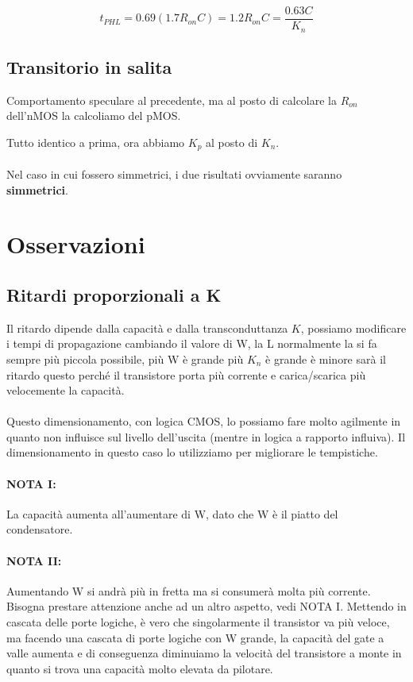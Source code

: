 \begin{equation*}
    t_{PHL} = 0.69(1.7R_{on}C) = 1.2R_{on}C = \frac{0.63C}{K_n}
\end{equation*}



\subsection{Transitorio in salita}
Comportamento speculare al	precedente, ma al posto di calcolare la $R_{on}$ dell'nMOS la calcoliamo del pMOS.

Tutto identico a prima, ora abbiamo $K_p$ al posto di $K_n$.

\paragraph{}
Nel caso in cui fossero simmetrici, i due risultati ovviamente saranno \textbf{simmetrici}.


\section{Osservazioni}

\subsection{Ritardi proporzionali a K}

Il ritardo dipende dalla capacità e dalla transconduttanza $K$, possiamo modificare i tempi di propagazione cambiando il valore di W, la L normalmente la si fa sempre più piccola possibile, più W è grande più $K_n$ è grande è minore sarà il ritardo questo perché il transistore porta più corrente e carica/scarica più velocemente la capacità.
\paragraph{}
Questo dimensionamento, con logica CMOS, lo possiamo fare molto agilmente in quanto non influisce sul livello dell'uscita (mentre in logica a rapporto influiva). Il dimensionamento in questo caso lo utilizziamo per migliorare le tempistiche.

\paragraph{NOTA I:} La capacità aumenta all'aumentare di W, dato che W è il piatto del condensatore.

\paragraph{NOTA II:} Aumentando W si andrà più in fretta ma si consumerà molta più corrente. Bisogna prestare attenzione anche ad un altro aspetto, vedi NOTA I. Mettendo in cascata delle porte logiche, è vero che singolarmente il transistor va più veloce, ma facendo una cascata di porte logiche con W grande, la capacità del gate a valle aumenta e di conseguenza diminuiamo la velocità del transistore a monte in quanto si trova una capacità molto elevata da pilotare.

